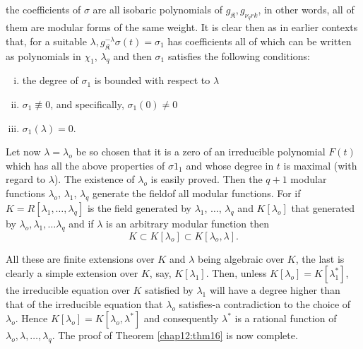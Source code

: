 the coefficients of $\sigma$ are all isobaric polynomials of $g_\mathfrak{K},
g_{\nu_q rk}$, in other words, all of them are modular forms of the
same weight. It is clear then as in earlier contexts that, for a
suitable $\lambda, g^{-\lambda}_\mathfrak{K} \sigma (t) = \sigma_1$ has
coefficients all of which can be written as polynomials in $\chi_1$,
$\lambda_q$ and then $\sigma_1$ satisfies the following conditions:  
\begin{enumerate}[i)] 
\item the degree of $\sigma_1$ is bounded with respect to $\lambda$ 
\item $\sigma_1 \not\equiv 0$, and specifically, $\sigma_1 (0) \neq
  0$ 
\item $\sigma_1 (\lambda)= 0$. 
\end{enumerate}



Let now $\lambda = \lambda_o$ be so chosen that it is a zero of an
irreducible polynomial $F(t)$ which has all the above properties of
$\sigma1_1$ and whose degree in $t$ is maximal (with regard to
$\lambda$). The existence of $\lambda_o$ is easily proved. Then the $q
+ 1$ modular functions $\lambda_o$, $\lambda_1$, $\lambda_q$ generate the
field\pageoriginale of all modular functions. For if $K = R[\lambda_1, \ldots,
  \lambda_q]$ is the field generated by $\lambda_1$, $\ldots$, $\lambda_q$
and $K[\lambda_o]$ that generated by $\lambda_o, \lambda_1, \ldots
\lambda_q$ and if $\lambda$ is an arbitrary modular function then  
$$
K \subset K [\lambda_o] \subset K [\lambda_o, \lambda].
$$

All these are finite extensions over $K$ and $\lambda$ being algebraic
over $K$, the last is clearly a simple extension over $K$, say,
$K[\lambda_1]$. Then, unless $K[\lambda_o] = K[\lambda^*_1]$, the
irreducible equation over $K$ satisfied by $\lambda_1$ will have a
degree higher than that of the irreducible equation that $\lambda_o$
satisfies-a contradiction to the choice of $\lambda_o$. Hence $K [
  \lambda_o] = K[\lambda_o, \lambda^*]$ and consequently $\lambda^*$
is a rational function of $\lambda_o, \lambda, \ldots, \lambda_q$.
The proof of Theorem \ref{chap12:thm16} is now complete. 

